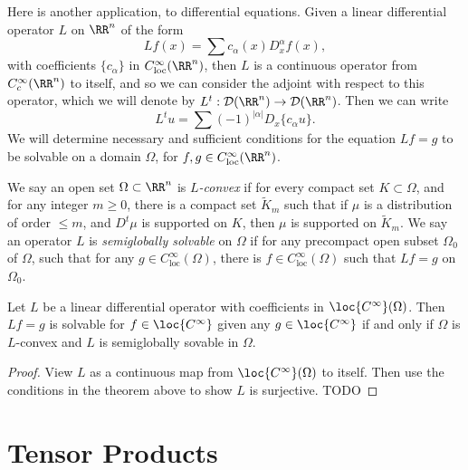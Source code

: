 Here is another application, to differential equations. Given a linear differential operator $L$ on $\RR^n$ of the form
%
\[ Lf(x) = \sum c_\alpha(x) D^\alpha_x f(x), \]
%
with coefficients $\{ c_\alpha \}$ in $C^\infty_{\text{loc}}(\RR^n)$, then $L$ is a continuous operator from $C_c^\infty(\RR^n)$ to itself, and so we can consider the adjoint with respect to this operator, which we will denote by $L^t: \mathcal{D}(\RR^n) \to \mathcal{D}(\RR^n)$. Then we can write
%
\[ L^t u = \sum (-1)^{|\alpha|} D_x \{ c_\alpha u \}. \]
%
We will determine necessary and sufficient conditions for the equation $Lf = g$ to be solvable on a domain $\Omega$, for $f,g \in C^\infty_{\text{loc}}(\RR^n)$.

We say an open set $\Omega \subset \RR^n$ is \emph{$L$-convex} if for every compact set $K \subset \Omega$, and for any integer $m \geq 0$, there is a compact set $\tilde{K}_m$ such that if $\mu$ is a distribution of order $\leq m$, and $D^t \mu$ is supported on $K$, then $\mu$ is supported on $\tilde{K}_m$. We say an operator $L$ is \emph{semiglobally solvable} on $\Omega$ if for any precompact open subset $\Omega_0$ of $\Omega$, such that for any $g \in C^\infty_{\text{loc}}(\Omega)$, there is $f \in C^\infty_{\text{loc}}(\Omega)$ such that $Lf = g$ on $\Omega_0$.

\begin{theorem}
    Let $L$ be a linear differential operator with coefficients in $\loc{C^\infty}(\Omega)$. Then $Lf = g$ is solvable for $f \in \loc{C^\infty}$ given any $g \in \loc{C^\infty}$ if and only if $\Omega$ is $L$-convex and $L$ is semiglobally sovable in $\Omega$.
\end{theorem}
\begin{proof}
    View $L$ as a continuous map from $\loc{C^\infty}(\Omega)$ to itself. Then use the conditions in the theorem above to show $L$ is surjective. TODO
\end{proof}






















\chapter{Tensor Products}

